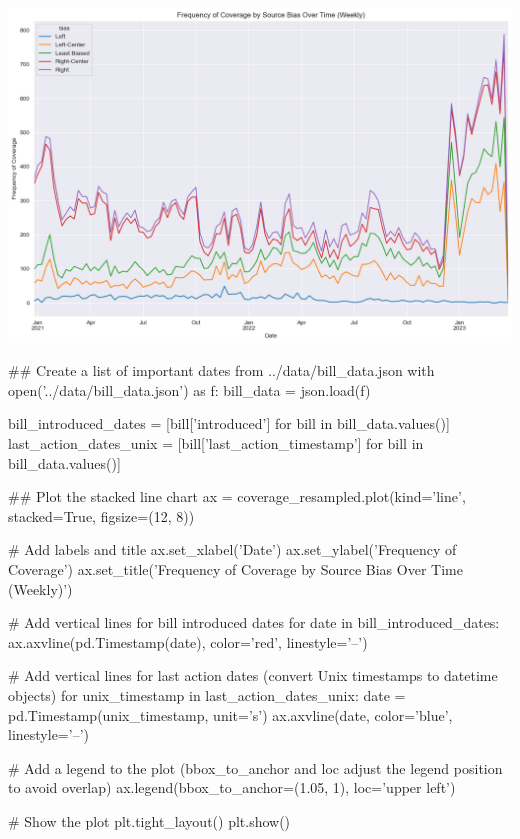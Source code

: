 \includegraphics[width=\textwidth]{./figs/fig_5.png}

\begin{pyin}
\## Create a list of important dates from ../data/bill_data.json
with open('../data/bill_data.json') as f:
    bill_data = json.load(f)

bill_introduced_dates = [bill['introduced'] for bill in bill_data.values()]
last_action_dates_unix = [bill['last_action_timestamp'] for bill in bill_data.values()]
\end{pyin}

\begin{pyin}
\## Plot the stacked line chart
ax = coverage_resampled.plot(kind='line', stacked=True, figsize=(12, 8))

# Add labels and title
ax.set_xlabel('Date')
ax.set_ylabel('Frequency of Coverage')
ax.set_title('Frequency of Coverage by Source Bias Over Time (Weekly)')

# Add vertical lines for bill introduced dates
for date in bill_introduced_dates:
    ax.axvline(pd.Timestamp(date), color='red', linestyle='--')

# Add vertical lines for last action dates (convert Unix timestamps to datetime objects)
for unix_timestamp in last_action_dates_unix:
    date = pd.Timestamp(unix_timestamp, unit='s')
    ax.axvline(date, color='blue', linestyle='--')

# Add a legend to the plot (bbox_to_anchor and loc adjust the legend position to avoid overlap)
ax.legend(bbox_to_anchor=(1.05, 1), loc='upper left')

# Show the plot
plt.tight_layout()
plt.show()
\end{pyin}

